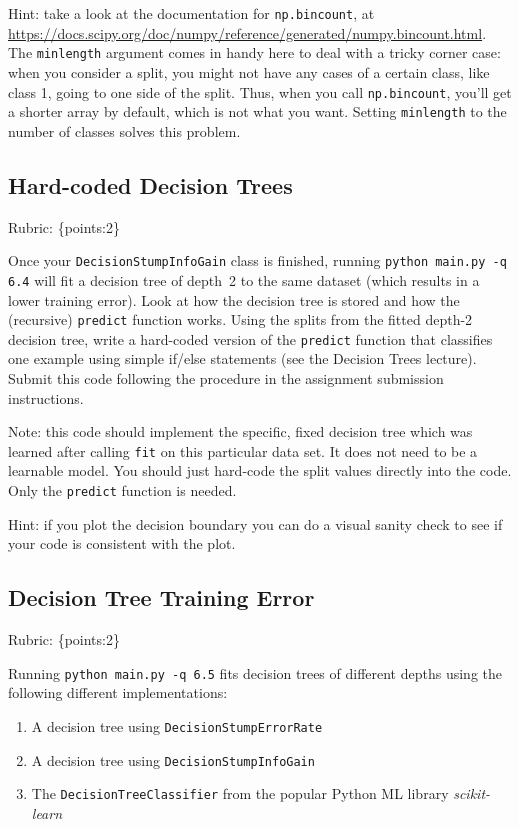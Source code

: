 \documentclass{article}
\def\rubric#1{\gre{Rubric: \{#1\}}}{}
\def\blu#1{{\color{blu}#1}}
\def\gre#1{{\color{gre}#1}}
\def\enum#1{\begin{enumerate}#1\end{enumerate}}
\begin{document}
	Hint: take a look at the documentation for \texttt{np.bincount}, at \\
	\url{https://docs.scipy.org/doc/numpy/reference/generated/numpy.bincount.html}.
	The \texttt{minlength} argument comes in handy here to deal with a tricky corner case:
	when you consider a split, you might not have any cases of a certain class, like class 1,
	going to one side of the split. Thus, when you call \texttt{np.bincount}, you'll get
	a shorter array by default, which is not what you want. Setting \texttt{minlength} to the
	number of classes solves this problem.

	\subsection{Hard-coded Decision Trees}
	\rubric{points:2}

	Once your \texttt{DecisionStumpInfoGain} class is finished, running \texttt{python main.py -q 6.4} will fit
	a decision tree of depth~2 to the same dataset (which results in a lower training error).
	Look at how the decision tree is stored and how the (recursive) \texttt{predict} function works.
	\blu{Using the splits from the fitted depth-2 decision tree, write a hard-coded version of the \texttt{predict}
		function that classifies one example using simple if/else statements
		(see the Decision Trees lecture). Submit this code following the procedure in the assignment submission instructions.}

	Note: this code should implement the specific, fixed decision tree
	which was learned after calling \texttt{fit} on this particular data set. It does not need to be a learnable model.
	You should just hard-code the split values directly into the code.
	Only the \texttt{predict} function is needed.

	Hint: if you plot the decision boundary you can do a visual sanity check to see if your code is consistent with the plot.





	\subsection{Decision Tree Training Error}
	\rubric{points:2}

	Running \texttt{python main.py -q 6.5} fits decision trees of different depths using the following different implementations:
	\enum{
		\item A decision tree using \texttt{DecisionStumpErrorRate}
		\item A decision tree using \texttt{DecisionStumpInfoGain}
		\item The \texttt{DecisionTreeClassifier} from the popular Python ML library \emph{scikit-learn}
	}
\end{document}
